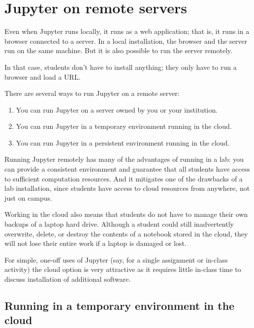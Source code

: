 \documentclass[]{book}
\providecommand{\tightlist}{%
  \setlength{\itemsep}{0pt}\setlength{\parskip}{0pt}}
\begin{document}
\section{Jupyter on remote servers}\label{jupyter-on-remote-servers}

Even when Jupyter runs locally, it runs as a web application; that is,
it runs in a browser connected to a server. In a local installation, the
browser and the server run on the same machine. But it is also possible
to run the server remotely.

In that case, students don't have to install anything; they only have to
run a browser and load a URL.

There are several ways to run Jupyter on a remote server:

\begin{enumerate}
\def\labelenumi{\arabic{enumi}.}
\tightlist
\item
  You can run Jupyter on a server owned by you or your institution.
\item
  You can run Jupyter in a temporary environment running in the cloud.
\item
  You can run Jupyter in a persistent environment running in the cloud.
\end{enumerate}

Running Jupyter remotely has many of the advantages of running in a lab:
you can provide a consistent environment and guarantee that all students
have access to sufficient computation resources. And it mitigates one of
the drawbacks of a lab installation, since students have access to cloud
resources from anywhere, not just on campus.

Working in the cloud also means that students do not have to manage
their own backups of a laptop hard drive. Although a student could still
inadvertently overwrite, delete, or destroy the contents of a notebook
stored in the cloud, they will not lose their entire work if a laptop is
damaged or lost.

For simple, one-off uses of Jupyter (say, for a single assignment or
in-class activity) the cloud option is very attractive as it requires
little in-class time to discuss installation of additional software.

\subsection{Running in a temporary environment in the
cloud}\label{running-in-a-temporary-environment-in-the-cloud}
\end{document}
